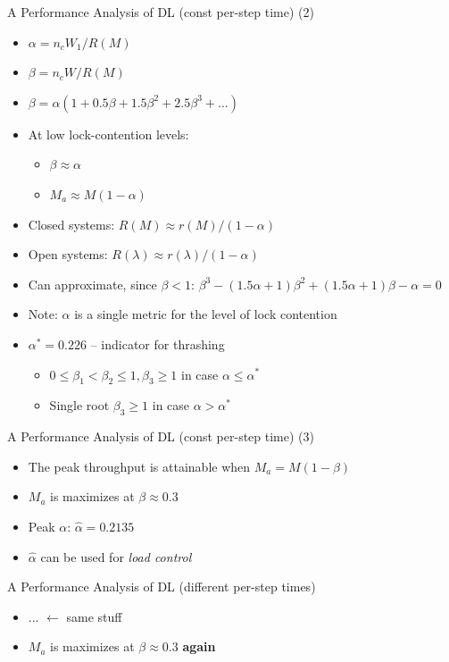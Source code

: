 \documentclass[sans]{beamer}
\begin{document}
\begin{frame}{A Performance Analysis of DL (const per-step time) (2)}
  \begin{itemize}
    \item $\alpha = n_c W_1 / R(M)$
    \item $\beta = n_cW/R(M)$
    \item $\beta = \alpha(1 + 0.5\beta + 1.5\beta^2 + 2.5\beta^3 + ...)$
    \item At low lock-contention levels:
      \begin{itemize}
        \item $\beta \approx \alpha$
        \item $M_a \approx M (1- \alpha)$
      \end{itemize}
    \item Closed systems: $R(M)\approx r(M) / (1 - \alpha)$
    \item Open systems: $R(\lambda)\approx r(\lambda) / (1 - \alpha)$
    \item Can approximate, since $\beta < 1$:
      $\beta ^3 - (1.5 \alpha + 1)\beta^2 + (1.5 \alpha + 1)\beta - \alpha = 0$
    \item Note: $\alpha$ is a single metric for the level of lock contention
    \item $\alpha^* = 0.226$ -- indicator for thrashing
    \begin{itemize}
      \item $0 \le \beta_1 < \beta_2 \le 1, \beta_3 \ge 1$ in case $\alpha \le \alpha^*$
      \item Single root $\beta_3 \ge 1$ in case $\alpha > \alpha^*$
    \end{itemize}
  \end{itemize}
\end{frame}

\begin{frame}{A Performance Analysis of DL (const per-step time) (3)}
  \begin{itemize}
    \item The peak throughput is attainable when $M_a = M (1 - \beta)$
    \item $M_a$ is maximizes at $\beta \approx 0.3$
    \item Peak $\alpha$: $\hat{\alpha} = 0.2135 $
    \item $\hat{\alpha}$ can be used for \emph{load control}
  \end{itemize}
\end{frame}

\begin{frame}{A Performance Analysis of DL (different per-step times)}
  \begin{itemize}
    \item ... $\leftarrow$ same stuff {\huge \smiley}
    \item $M_a$ is maximizes at $\beta \approx 0.3$ \textbf{again}
  \end{itemize}
\end{frame}
\end{document}
